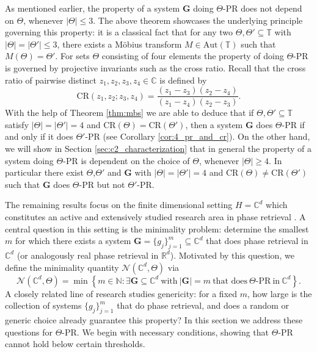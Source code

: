 \documentclass[reqno,a4paper,11pt]{amsart}
\numberwithin{equation}{section}
\def\N{{\mathbb N}}
\def\R{{\mathbb R}}
\def\T{{\mathbb T}}
\def\C{{\mathbb C}}
\newcommand{\Cd}{{\C^d}}
\newcommand\1{\mathds{1}}
\newcommand{\cratio}{{\mathrm{CR}}}
\begin{document}
As mentioned earlier, the property of a system $\mathbf{G}$ doing $\Theta$-PR does not depend on $\Theta$, whenever $|\Theta|\leq 3$. The above theorem showcases the underlying principle governing this property: it is a classical fact that for any two $\Theta,\Theta'\subseteq \T$ with $|\Theta|=|\Theta'|\leq 3$, there exists a Möbius transform $M\in \text{Aut}(\T)$ such that $M(\Theta)=\Theta'$.
For sets $\Theta$ consisting of four elements the property of doing $\Theta$-PR is governed by projective invariants such as the cross ratio. Recall that the cross ratio of pairwise distinct $z_1,z_2,z_3,z_4 \in \C$ is defined by
$$
\cratio(z_1,z_2;z_3,z_4) = \frac{(z_1-z_3)(z_2-z_4)}{(z_1-z_4)(z_2-z_3)}.
$$
With the help of Theorem \ref{thm:mbs} we are able to deduce that if $\Theta,\Theta'\subseteq \T$ satisfy $|\Theta|=|\Theta'|=4$ and $\cratio(\Theta)=\cratio(\Theta')$, then a system $\mathbf{G}$ does $\Theta$-PR if and only if it does $\Theta'$-PR (see Corollary \ref{cor:4_pr_and_cr}).
On the other hand, we will show in Section \ref{sec:c2_characterization} that in general the property of a system doing $\Theta$-PR is dependent on the choice of $\Theta$, whenever $|\Theta|\geq 4$. In particular there exist $\Theta$,$\Theta'$ and $\mathbf{G}$ with $|\Theta|=|\Theta'|=4$ and $\cratio(\Theta) \neq \cratio(\Theta')$ such that $\mathbf{G}$ does $\Theta$-PR but not $\Theta'$-PR.

The remaining results focus on the finite dimensional setting $H=\C^d$ which constitutes an active and extensively studied research area in phase retrieval \cite{conca2015algebraic,balan2006signal,balan2009painless,xia2025stability}. A central question in this setting is the minimality problem: determine the smallest $m$ for which there exists a system $\mathbf{G}=\{g_j\}_{j=1}^m\subseteq \C^d$ that does phase retrieval in $\Cd$ (or analogously real phase retrieval in $\R^d$). Motivated by this question, we define the minimality quantity $\mathcal{N}(\C^d,\Theta)$ via
$$
\mathcal{N}(\C^d,\Theta) = \min \left \{ m \in \N :  \exists \mathbf{G} \subseteq \C^d \ \text{with} \ |\mathbf{G}| = m \ \text{that does} \ \Theta\text{-PR} \ \text{in} \ \C^d \right \}.
$$
A closely related line of research studies genericity: for a fixed $m$, how large is the collection of systems $\{g_j\}_{j=1}^m$ that do phase retrieval, and does a random or generic choice already guarantee this property? In this section we address these questions for $\Theta$-PR. We begin with necessary conditions, showing that $\Theta$-PR cannot hold below certain thresholds.
\end{document}
